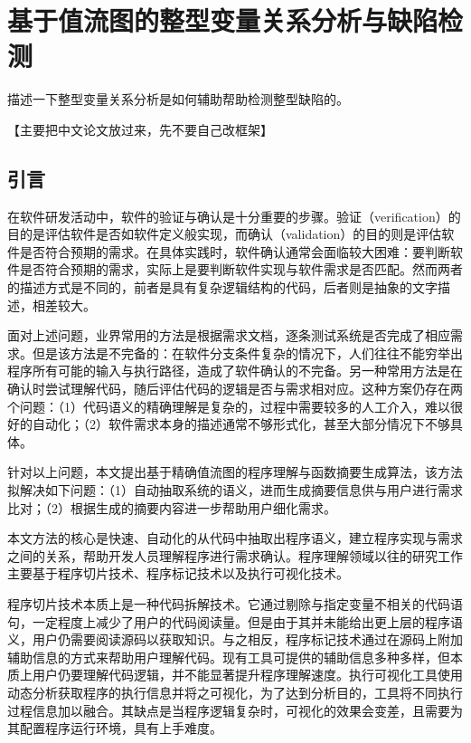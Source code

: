 
\chapter{基于值流图的整型变量关系分析与缺陷检测}

描述一下整型变量关系分析是如何辅助帮助检测整型缺陷的。

【主要把中文论文放过来，先不要自己改框架】

\section{引言}

在软件研发活动中，软件的验证与确认\cite{wagner2016functionally, wallace1989software}是十分重要的步骤。验证（verification）的目的是评估软件是否如软件定义般实现，而确认（validation）的目的则是评估软件是否符合预期的需求。在具体实践时，软件确认通常会面临较大困难\cite{wagner2013software}：要判断软件是否符合预期的需求，实际上是要判断软件实现与软件需求是否匹配。然而两者的描述方式是不同的，前者是具有复杂逻辑结构的代码，后者则是抽象的文字描述，相差较大。

面对上述问题，业界常用的方法是根据需求文档，逐条测试系统是否完成了相应需求\cite{ramler2006value}。但是该方法是不完备的：在软件分支条件复杂的情况下，人们往往不能穷举出程序所有可能的输入与执行路径，造成了软件确认的不完备。另一种常用方法是在确认时尝试理解代码，随后评估代码的逻辑是否与需求相对应。这种方案仍存在两个问题：（1）代码语义的精确理解是复杂的，过程中需要较多的人工介入\cite{ko2007information, murphy2006java, corbi1989program}，难以很好的自动化；（2）软件需求本身的描述通常不够形式化，甚至大部分情况下不够具体。

针对以上问题，本文提出基于精确值流图的程序理解与函数摘要生成算法，该方法拟解决如下问题：（1）自动抽取系统的语义，进而生成摘要信息供与用户进行需求比对；（2）根据生成的摘要内容进一步帮助用户细化需求。

本文方法的核心是快速、自动化的从代码中抽取出程序语义，建立程序实现与需求之间的关系，帮助开发人员理解程序进行需求确认。程序理解\cite{boysen1979factors, sackman1968exploratory}领域以往的研究工作主要基于程序切片技术、程序标记技术以及执行可视化技术。

程序切片技术\cite{binkley1996program}本质上是一种代码拆解技术。它通过剔除与指定变量不相关的代码语句，一定程度上减少了用户的代码阅读量。但是由于其并未能给出更上层的程序语义，用户仍需要阅读源码以获取知识。与之相反，程序标记技术\cite{sulir2017labeling}通过在源码上附加辅助信息的方式来帮助用户理解代码。现有工具可提供的辅助信息多种多样，但本质上用户仍要理解代码逻辑，并不能显著提升程序理解速度。执行可视化工具使用动态分析获取程序的执行信息并将之可视化，为了达到分析目的，工具将不同执行过程信息加以融合。其缺点是当程序逻辑复杂时，可视化的效果会变差，且需要为其配置程序运行环境，具有上手难度。 

